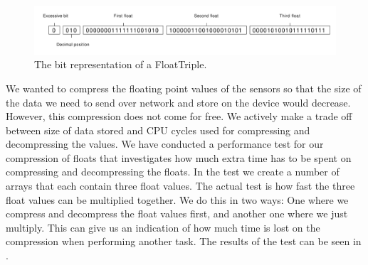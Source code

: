 \begin{figure}[!htbp]
    \centering
    \includegraphics[width=\textwidth]{graphic/gathering_sensor_data/float_triple_bit.pdf}
    \caption{The bit representation of a FloatTriple.}
    \label{fig:float_triple_bit}
\end{figure}
We wanted to compress the floating point values of the sensors so that the size of the data we need to send over network and store on the device would decrease. However, this compression does not come for free. We actively make a trade off between size of data stored and CPU cycles used for compressing and decompressing the values. We have conducted a performance test for our compression of floats that investigates how much extra time has to be spent on compressing and decompressing the floats. In the test we create a number of arrays that each contain three float values. The actual test is how fast the three float values can be multiplied together. We do this in two ways: One where we compress and decompress the float values first, and another one where we just multiply. This can give us an indication of how much time is lost on the compression when performing another task. The results of the test can be seen in .

